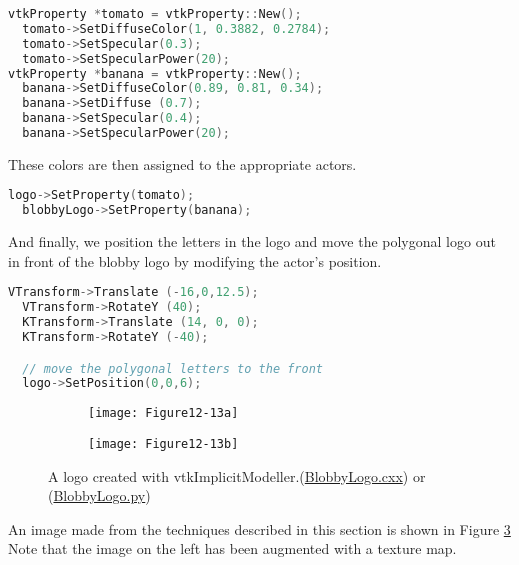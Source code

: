 \begin{lstlisting}[language=C++, caption={Define colors.}]
vtkProperty *tomato = vtkProperty::New();
  tomato->SetDiffuseColor(1, 0.3882, 0.2784);
  tomato->SetSpecular(0.3);
  tomato->SetSpecularPower(20);
vtkProperty *banana = vtkProperty::New();
  banana->SetDiffuseColor(0.89, 0.81, 0.34);
  banana->SetDiffuse (0.7);
  banana->SetSpecular(0.4);
  banana->SetSpecularPower(20);
\end{lstlisting}

These colors are then assigned to the appropriate actors.

\begin{lstlisting}[language=C++, caption={Assign colors to the appropriate actors.}]
  logo->SetProperty(tomato);
  blobbyLogo->SetProperty(banana);
\end{lstlisting}

And finally, we position the letters in the logo and move the
polygonal logo out in front of the blobby logo by modifying the
actor's position.

\begin{lstlisting}[language=C++, caption={Position the letters and move the polygonal logo.}]
  VTransform->Translate (-16,0,12.5);
  VTransform->RotateY (40);
  KTransform->Translate (14, 0, 0);
  KTransform->RotateY (-40);

  // move the polygonal letters to the front
  logo->SetPosition(0,0,6);
\end{lstlisting}

\begin{figure}[htb]
	\begin{subfigure}[h]{0.48\linewidth}
		\texttt{[image: Figure12-13a]}
		\caption*{}
		\label{fig:Figure12-13a}
	\end{subfigure}
	\hfill
	\begin{subfigure}[h]{0.48\linewidth}
		\texttt{[image: Figure12-13b]}
		\caption*{}
		\label{fig:Figure12-13b}
	\end{subfigure}
	\caption{A logo created with vtkImplicitModeller.(\href{https://lorensen.github.io/VTKExamples/site/Cxx/Visualization/BlobbyLogo/}{BlobbyLogo.cxx}) or (\href{https://lorensen.github.io/VTKExamples/site/Python/Visualization/BlobbyLogo/}{BlobbyLogo.py})}\label{fig:Figure12-13}
\end{figure}


An image made from the techniques described in this section is shown
in Figure \ref{fig:Figure12-13}  Note that the image on the left has been augmented with a texture map.

